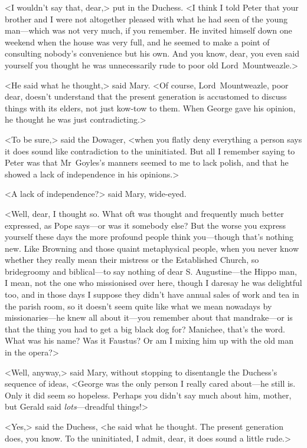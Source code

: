 <I wouldn't say that, dear,> put in the Duchess. <I think I told Peter that your brother and I were not altogether pleased with what he had seen of the young man—which was not very much, if you remember. He invited himself down one weekend when the house was very full, and he seemed to make a point of consulting nobody's convenience but his own. And you know, dear, you even said yourself you thought he was unnecessarily rude to poor old Lord~Mountweazle.>

<He said what he thought,> said Mary. <Of course, Lord~Mountweazle, poor dear, doesn't understand that the present generation is accustomed to discuss things with its elders, not just kow-tow to them. When George gave his opinion, he thought he was just contradicting.>

<To be sure,> said the Dowager, <when you flatly deny everything a person says it does sound like contradiction to the uninitiated. But all I remember saying to Peter was that Mr~Goyles's manners seemed to me to lack polish, and that he showed a lack of independence in his opinions.>

<A lack of independence?> said Mary, wide-eyed.

<Well, dear, I thought so. What oft was thought and frequently much better expressed, as Pope says—or was it somebody else? But the worse you express yourself these days the more profound people think you—though that's nothing new. Like Browning and those quaint metaphysical people, when you never know whether they really mean their mistress or the Established Church, so bridegroomy and biblical—to say nothing of dear S\@. Augustine—the Hippo man, I mean, not the one who missionised over here, though I daresay he was delightful too, and in those days I suppose they didn't have annual sales of work and tea in the parish room, so it doesn't seem quite like what we mean nowadays by missionaries—he knew all about it—you remember about that mandrake—or is that the thing you had to get a big black dog for?  Manichee, that's the word. What was his name? Was it Faustus? Or am I mixing him up with the old man in the opera?>

<Well, anyway,> said Mary, without stopping to disentangle the Duchess's sequence of ideas, <George was the only person I really cared about—he still is. Only it did seem so hopeless. Perhaps you didn't say much about him, mother, but Gerald said \emph{lots}—dreadful things!>

<Yes,> said the Duchess, <he said what he thought. The present generation does, you know. To the uninitiated, I admit, dear, it does sound a little rude.>

